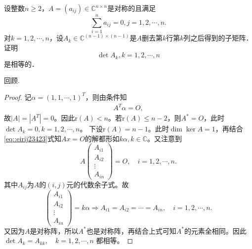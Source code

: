 \documentclass[../../main.tex]{subfiles}
\begin{document}
\begin{example}
设整数$n \geq 2$，$A = (a_{ij}) \in \mathbb{C}^{n \times n}$是对称的且满足
$$\sum_{i=1}^n a_{ij} = 0, j = 1, 2, \cdots, n.$$
对$k = 1, 2, \cdots, n$，设$A_k \in \mathbb{C}^{(n-1) \times (n-1)}$是$A$删去第$k$行第$k$列之后得到的子矩阵．证明
$$\det A_k, k = 1, 2, \cdots, n$$
是相等的．
\end{example}
\begin{remark}
回顾.
\end{remark}
\begin{proof}
记$\alpha = (1,1,\cdots,1)^T$，则由条件知
\begin{align}
A^T \alpha = O, \label{eq::eirij23423}
\end{align}
故$|A| = |A^T| = 0$。因此$\text{r}(A) < n$。若$\text{r}(A) \leq n-2$，则$A^* = O$，此时
$\det A_k = 0, k = 1,2,\cdots,n$。
下设$\text{r}(A) = n-1$。此时$\dim \ker A = 1$，再结合\eqref{eq::eirij23423}式知$Ax = O$的解都形如$k\alpha, k \in \mathbb{C}$。又注意到
$$A\begin{pmatrix} A_{i1} \\ A_{i2} \\ \vdots \\ A_{in} \end{pmatrix} = O, \quad i = 1,2,\cdots,n.$$
其中$A_{ij}$为$A$的$(i,j)$元的代数余子式。故
$$\begin{pmatrix} A_{i1} \\ A_{i2} \\ \vdots \\ A_{in} \end{pmatrix} = k\alpha \Longrightarrow A_{i1} = A_{i2} = \cdots = A_{in}, \quad i = 1,2,\cdots,n.$$
又因为$A$是对称阵，所以$A^*$也是对称阵，再结合上式可知$A^*$的元素全相同。因此
$\det A_k = A_{kk}, \quad k = 1,2,\cdots,n$
都相等。

\end{proof}
\end{document}
